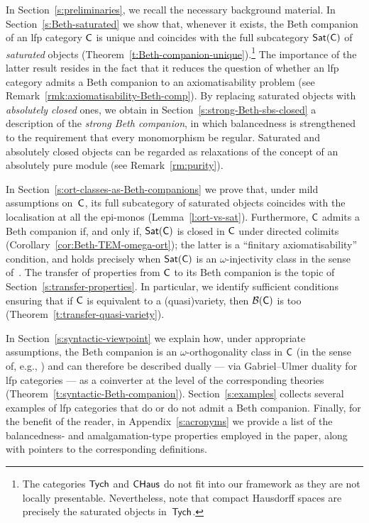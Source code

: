 \documentclass[a4paper,10pt,reqno]{amsart}
\theoremstyle{definition}
\theoremstyle{remark}
\newcommand{\cat}{{\sf C}}								%
\newcommand{\CHaus}{{\sf CHaus}}							%
\newcommand{\Tych}{{\sf Tych}}							%
\newcommand{\B}[1]{\mathcal{B}(#1)}						%
\newcommand{\Sat}{{\sf Sat}}								%
\begin{document}
In Section~\ref{s:preliminaries}, we recall the necessary background material. In Section~\ref{s:Beth-saturated} we show that, whenever it exists, the Beth companion of an lfp category $\cat$ is unique and coincides with the full subcategory $\Sat(\cat)$ of \emph{saturated} objects (Theorem~\ref{t:Beth-companion-unique}).\footnote{The categories $\Tych$ and $\CHaus$ do not fit into our framework as they are not locally presentable. Nevertheless, note that compact Hausdorff spaces are precisely the saturated objects in~$\Tych$.} The importance of the latter result resides in the fact that it reduces the question of whether an lfp category admits a Beth companion to an axiomatisability problem (see Remark~\ref{rmk:axiomatisability-Beth-comp}). By replacing saturated objects with \emph{absolutely closed} ones, we obtain in Section~\ref{s:strong-Beth-sbs-closed} a description of the \emph{strong Beth companion}, in which balancedness is strengthened to the requirement that every monomorphism be regular. Saturated and absolutely closed objects can be regarded as relaxations of the concept of an absolutely pure module (see Remark~\ref{rm:purity}). 

In Section~\ref{s:ort-classes-as-Beth-companions} we prove that, under mild assumptions on~$\cat$, its full subcategory of saturated objects coincides with the localisation at all the epi-monos (Lemma~\ref{l:ort-vs-sat}). Furthermore, $\cat$ admits a Beth companion if, and only if, $\Sat(\cat)$ is closed in $\cat$ under directed colimits (Corollary~\ref{cor:Beth-TEM-omega-ort}); the latter is a ``finitary axiomatisability'' condition, and holds precisely when $\Sat(\cat)$ is an $\omega$-injectivity class in the sense of~\cite{RAB2022}. The transfer of properties from $\cat$ to its Beth companion is the topic of Section~\ref{s:transfer-properties}. In particular, we identify sufficient conditions ensuring that if $\cat$ is equivalent to a (quasi)variety, then $\B{\cat}$ is too (Theorem~\ref{t:transfer-quasi-variety}). 

In Section~\ref{s:syntactic-viewpoint} we explain how, under appropriate assumptions, the Beth companion is an $\omega$-orthogonality class in $\cat$ (in the sense of, e.g., \cite[Definition~1.35]{ar94book}) and can therefore be described dually --- via Gabriel--Ulmer duality for lfp categories --- as a coinverter at the level of the corresponding theories (Theorem~\ref{t:syntactic-Beth-companion}). Section~\ref{s:examples} collects several examples of lfp categories that do or do not admit a Beth companion.
%
Finally, for the benefit of the reader, in Appendix~\ref{s:acronyms} we provide a list of the balancedness- and amalgamation-type properties employed in the paper, along with pointers to the corresponding definitions.
\end{document}

